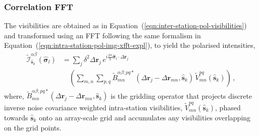 \documentclass[
  journal=pasa,
  manuscript=article-type,
  year=2020,
  volume=37,
]{cup-journal}
\begin{document}
\subsubsection{Correlation FFT}

The visibilities are obtained as in Equation~(\ref{eqn:inter-station-pol-visibilities}) and transformed using an FFT following the same formalism in Equation~(\ref{eqn:intra-station-pol-img-xfft-expl}), to yield the polarised intensities,
\begin{align}
  \widetilde{\mathcal{I}}_{\hat{\boldsymbol{s}}_k}^{\alpha\beta}(\hat{\boldsymbol{\sigma}}_l) &= \sum_j \delta^2 \Delta\boldsymbol{r}_j \, e^{i\frac{2\pi}{\lambda} \hat{\boldsymbol{\sigma}}_l\cdot\Delta\boldsymbol{r}_j} \nonumber\\
  &\quad \left(\sum_{m,n} \sum_{p,q} \widetilde{B}_{mn}^{\alpha\beta;pq*}(\Delta\boldsymbol{r}_j-\Delta\boldsymbol{r}_{mn}, \hat{\boldsymbol{s}}_k) \, \widetilde{V}_{mn}^{pq}(\hat{\boldsymbol{s}}_k) \right) \, , \label{eqn:inter-station-pol-img-xfft-expl}
\end{align}
where, $\widetilde{B}_{mn}^{\alpha\beta;pq*}(\Delta\boldsymbol{r}_j-\Delta\boldsymbol{r}_{mn}, \hat{\boldsymbol{s}}_k)$ is the gridding operator that projects discrete inverse noise covariance weighted intra-station visibilities, $\widetilde{V}_{mn}^{pq}(\hat{\boldsymbol{s}}_k)$, phased towards $\hat{\boldsymbol{s}}_k$ onto an array-scale grid and accumulates any visibilities overlapping on the grid points. 

\end{document}
